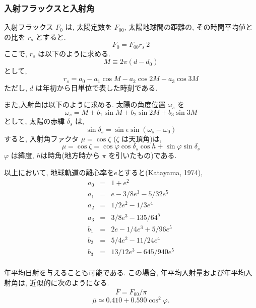 \subsubsection{入射フラックスと入射角 }

入射フラックス $F_0$ は,
太陽定数を $F_{00}$, 
太陽地球間の距離の, 
その時間平均値との比を $r_s$ とすると.
%
\begin{equation}
F_0 = F_{00} r_s^-2 
\end{equation}
ここで, $r_s$ は以下のように求める.
%
\begin{equation}
  M \equiv 2 \pi ( d - d_0 ) 
\end{equation}
として,
\begin{equation}
  r_s = a_0 - a_1 \cos M - a_2 \cos 2M - a_3 \cos 3M
\end{equation}
ただし, $d$ は年初から日単位で表した時刻である.

また,入射角は以下のように求める.
太陽の角度位置 $\omega_s$ を
\begin{equation}
  \omega_s = M + b_1 \sin M + b_2 \sin 2M + b_3 \sin 3M
\end{equation}
として,  太陽の赤緯 $\delta_s$ は,
\begin{equation}
  \sin \delta_s = \sin \epsilon \sin ( \omega_s - \omega_0 ) 
\end{equation}
%
すると, 入射角ファクタ $\mu = \cos \zeta$ ($\zeta$ は天頂角)は,
\begin{equation}
\mu = \cos \zeta = \cos \varphi \cos \delta_s \cos h
                 + \sin \varphi \sin \delta_s
\end{equation}
$\varphi$ は緯度,
$h$は時角(地方時から $\pi$ を引いたもの)である.

以上において, 地球軌道の離心率を$e$とすると(Katayama, 1974),
\begin{eqnarray}
   a_0 & = &  1 + e^2 \\
   a_1 & = &  e - 3/8 e^3 - 5/32 e^5 \\
   a_2 & = &  1/2 e^2 - 1/3e^4 \\
   a_3 & = &  3/8 e^3 - 135/64^5 \\
   b_1 & = & 2e - 1/4 e^3 + 5/96 e^5 \\
   b_2 & = & 5/4 e^2 - 11/24 e^4 \\
   b_3 & = & 13/12 e^3 - 645/940 e^5 \\
\end{eqnarray}

年平均日射を与えることも可能である.
この場合, 年平均入射量および年平均入射角は, 
近似的に次のようになる.
%
\begin{equation}
\overline{F} = F_{00}/\pi
\end{equation}
%
\begin{equation}
\overline{\mu} \simeq 0.410 + 0.590 \cos^2 \varphi .
\end{equation}

